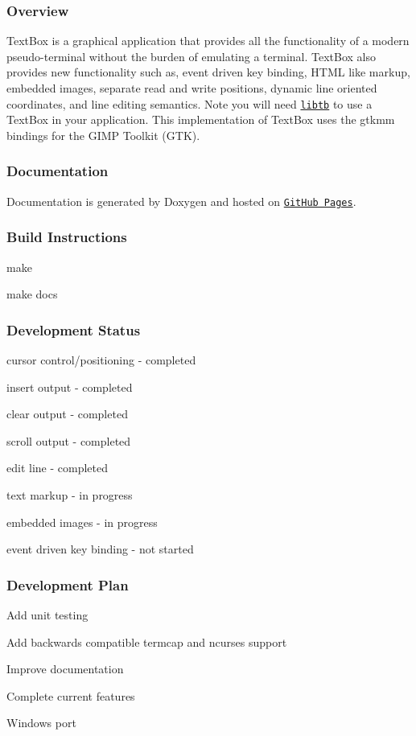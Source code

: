 \subsubsection*{Overview}

Text\+Box is a graphical application that provides all the functionality of a modern pseudo-\/terminal without the burden of emulating a terminal. Text\+Box also provides new functionality such as, event driven key binding, H\+T\+ML like markup, embedded images, separate read and write positions, dynamic line oriented coordinates, and line editing semantics. Note you will need \href{https://codrod.github.io/libtb/index.html}{\tt libtb} to use a Text\+Box in your application. This implementation of Text\+Box uses the gtkmm bindings for the G\+I\+MP Toolkit (G\+TK).

\subsubsection*{Documentation}

Documentation is generated by Doxygen and hosted on \href{https://codrod.github.io/gtb/index.html}{\tt Git\+Hub Pages}.

\subsubsection*{Build Instructions}


\begin{DoxyItemize}
\item make
\item make docs
\end{DoxyItemize}

\subsubsection*{Development Status}


\begin{DoxyItemize}
\item cursor control/positioning -\/ completed
\item insert output -\/ completed
\item clear output -\/ completed
\item scroll output -\/ completed
\item edit line -\/ completed
\item text markup -\/ in progress
\item embedded images -\/ in progress
\item event driven key binding -\/ not started
\end{DoxyItemize}

\subsubsection*{Development Plan}


\begin{DoxyEnumerate}
\item Add unit testing
\item Add backwards compatible termcap and ncurses support
\item Improve documentation
\item Complete current features
\item Windows port 
\end{DoxyEnumerate}